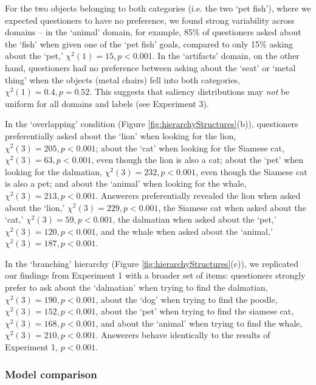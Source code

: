 \documentclass[12pt, floatsintext, jou]{apa6}
\begin{document}
For the two objects belonging to both categories (i.e. the two `pet fish'), where we expected questioners to have no preference, we found strong variability across domains -- in the `animal' domain, for example, 85\% of questioners asked about the `fish' when given one of the `pet fish' goals, compared to only 15\% asking about the `pet,' $\chi^2(1) = 15, p < 0.001$. In the `artifacts' domain, on the other hand, questioners had no preference between asking about the `seat' or `metal thing' when the objects (metal chairs) fell into both categories, $\chi^2(1) = 0.4, p = 0.52$. This suggests that saliency distributions may \emph{not} be uniform for all domains and labels (see Experiment 3).

In the `overlapping' condition (Figure \ref{fig:hierarchyStructures}(b)), questioners preferentially asked about the `lion' when looking for the lion, $\chi^2(3) = 205, p < 0.001$; about the `cat' when looking for the Siamese cat, $\chi^2(3) = 63, p < 0.001$, even though the lion is also a cat; about the `pet' when looking for the dalmatian, $\chi^2(3) = 232, p < 0.001$, even though the Siamese cat is also a pet; and about the `animal' when looking for the whale, $\chi^2(3) = 213, p < 0.001$. Answerers preferentially revealed the lion when asked about the `lion,' $\chi^2(3) = 229, p < 0.001$, the Siamese cat when asked about the `cat,' $\chi^2(3) = 59, p < 0.001$, the dalmatian when asked about the `pet,' $\chi^2(3) = 120, p < 0.001$, and the whale when asked about the `animal,' $\chi^2(3) = 187, p < 0.001$. 

In the `branching' hierarchy (Figure \ref{fig:hierarchyStructures}(c)), we replicated our findings from Experiment 1 with a broader set of items: questioners strongly prefer to ask about the `dalmatian' when trying to find the dalmatian, $\chi^2(3) = 190, p < 0.001$, about the `dog' when trying to find the poodle, $\chi^2(3) = 152, p < 0.001$, about the `pet' when trying to find the siamese cat, $\chi^2(3) = 168, p < 0.001$, and about the `animal' when trying to find the whale, $\chi^2(3) = 210, p < 0.001$. Answerers behave identically to the results of Experiment 1, $p < 0.001$.



\subsubsection{Model comparison}
\end{document}
